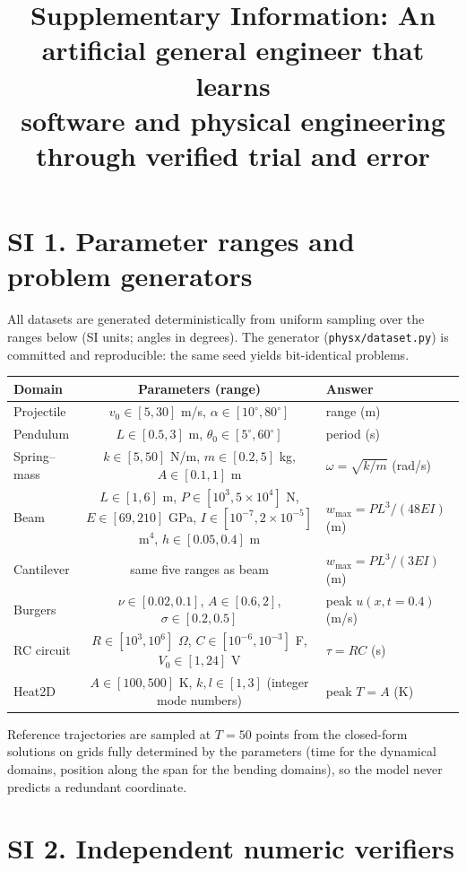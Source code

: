 \documentclass[11pt,a4paper]{article}
\title{Supplementary Information: An artificial general engineer that learns\\
software and physical engineering through verified trial and error}
\author{}
\date{}
\begin{document}
\maketitle

\section*{SI 1. Parameter ranges and problem generators}

All datasets are generated deterministically from uniform sampling over the
ranges below (SI units; angles in degrees). The generator
(\texttt{physx/dataset.py}) is committed and reproducible: the same seed
yields bit-identical problems.

\begin{center}
\small
\begin{tabular}{lcl}
\toprule
Domain & Parameters (range) & Answer \\
\midrule
Projectile & $v_0 \in [5,30]$ m/s, $\alpha \in [10^\circ, 80^\circ]$ & range (m) \\
Pendulum & $L \in [0.5,3]$ m, $\theta_0 \in [5^\circ,60^\circ]$ & period (s) \\
Spring--mass & $k \in [5,50]$ N/m, $m \in [0.2,5]$ kg, $A \in [0.1,1]$ m & $\omega=\sqrt{k/m}$ (rad/s) \\
Beam & $L \in [1,6]$ m, $P \in [10^3,5\times10^4]$ N, $E \in [69,210]$ GPa, $I \in [10^{-7},2\times10^{-5}]$ m$^4$, $h \in [0.05,0.4]$ m & $w_{\max}=PL^3/(48EI)$ (m) \\
Cantilever & same five ranges as beam & $w_{\max}=PL^3/(3EI)$ (m) \\
Burgers & $\nu \in [0.02,0.1]$, $A \in [0.6,2]$, $\sigma \in [0.2,0.5]$ & peak $u(x, t{=}0.4)$ (m/s) \\
RC circuit & $R \in [10^3,10^6]$ $\Omega$, $C \in [10^{-6},10^{-3}]$ F, $V_0 \in [1,24]$ V & $\tau = RC$ (s) \\
Heat2D & $A \in [100,500]$ K, $k,l \in [1,3]$ (integer mode numbers) & peak $T = A$ (K) \\
\bottomrule
\end{tabular}
\end{center}

Reference trajectories are sampled at $T=50$ points from the closed-form
solutions on grids fully determined by the parameters (time for the
dynamical domains, position along the span for the bending domains), so the
model never predicts a redundant coordinate.

\section*{SI 2. Independent numeric verifiers}
\end{document}
